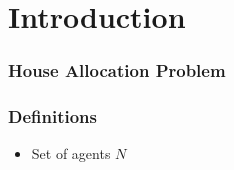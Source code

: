 \section{Introduction}

\subsubsection{House Allocation Problem}
\begin{frame}
    \frametitle{Definitions}
    \begin{itemize}
        \item  Set of agents $N$ \\
    \end{itemize}
\end{frame}

